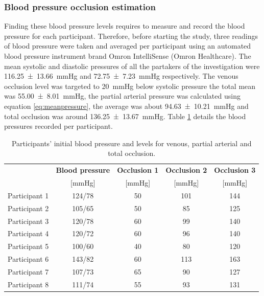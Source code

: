 \subsubsection{Blood pressure occlusion estimation}
Finding these blood pressure levels requires to measure and record the blood pressure for each participant. Therefore, before starting the study, three readings of blood pressure were taken and averaged per participant using an automated blood pressure instrument brand Omron IntelliSense (Omron Healthcare). The mean systolic and diastolic pressures of all the partakers of the investigation were \SI{116.25(1366)}{\mmHg} and \SI{72.75(723)}{\mmHg} respectively. The venous occlusion level was targeted to \SI{20}{\mmHg} below systolic pressure the total mean was \SI{55.00(801)}{\mmHg}, the partial arterial pressure was calculated using equation \ref{eq:meanpressure}, the average was about \SI{94.63(1021)}{\mmHg} and total occlusion was around \SI{136.25(1367)}{\mmHg}. Table \ref{tbl:occlusions} details the blood pressures recorded per participant.

\begin{table}[!htbp] %
	\caption[Blood pressure and occlusion levels of the participants]{Participants' initial blood pressure and levels for venous, partial arterial and total occlusion.}
	\label{tbl:occlusions}
	\centering
	\begin{tabular}    {lcccc}
		\toprule
		& \textbf{Blood pressure}  &  \textbf{Occlusion 1}   & \textbf{Occlusion 2}  &  \textbf{Occlusion 3} \\
		&  [\si{\mmHg}]   &        [\si{\mmHg}]  &    [\si{\mmHg}]   &  [\si{\mmHg}]\\ \midrule
		Participant 1  &  124/78   &        50  &    101   &  144\\ 
		Participant 2  &  105/65   &        50  &     85   &  125 \\
		Participant 3  &  120/78   &        60  &     99   &  140 \\
		Participant 4  &  120/72   &        60  &     96   &  140 \\
		Participant 5  &  100/60   &        40  &     80   &  120 \\
		Participant 6  &  143/82   &        60  &    113   &  163 \\
		Participant 7  &  107/73   &        65  &     90   &  127 \\
		Participant 8  &  111/74   &        55  &     93   &  131 \\\bottomrule
	\end{tabular}
\end{table}

